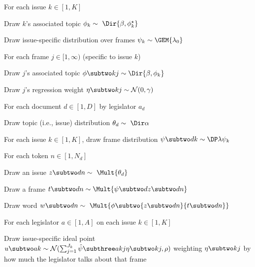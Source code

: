 \begin{small}
\begin{enumerate*}
  \item For each issue $k \in [1,K]$
  \begin{enumerate*}
    \item Draw $k$'s associated topic $\phi_k \sim~\Dir {\beta, \phi_k^{\star}}$
    \item Draw issue-specific distribution over frames $\psi_k \sim \GEM {\lambda_0}$
    \item For each frame $j \in [1, \infty)$ (specific to issue $k$)
    \begin{enumerate*}
      \item Draw $j$'s associated topic $\phi \subtwo kj \sim \Dir {\beta, \phi_k}$
      \item Draw $j$'s regression weight $\eta \subtwo kj \sim \mathcal{N}(0, \gamma)$
    \end{enumerate*}
  \end{enumerate*}
  \item For each document $d \in [1,D]$ by legislator $a_d$
  \begin{enumerate*}
    \item Draw topic (i.e., issue) distribution $\theta_d \sim~\Dir \alpha$
    \item For each issue $k \in [1,K]$, draw frame distribution $\psi \subtwo dk \sim \DP \lambda {\psi_k}$
    \item For each token $n \in [1, N_d]$
    \begin{enumerate*}
      \item Draw an issue $z \subtwo dn \sim~\Mult {\theta_d}$
      \item Draw a frame $t \subtwo dn \sim \Mult {\psi \subtwo d {z \subtwo
          dn}}$
      \item Draw word $w \subtwo dn \sim~\Mult {\phi \subtwo {z \subtwo dn}{t \subtwo
          dn}}$
    \end{enumerate*}
  \end{enumerate*}
  \item For each legislator $a \in [1, A]$ on each issue $k \in [1, K]$
  \begin{enumerate*}
    \item Draw issue-specific ideal point
    $u \subtwo ak \sim \mathcal{N}(\sum_{j=1}^{J_k} \hat{\psi} \subthree akj \eta \subtwo kj, \rho)$
      weighting $\eta \subtwo kj$ by how much the legislator talks about that frame
  \end{enumerate*}

\end{enumerate*}
\end{small}
